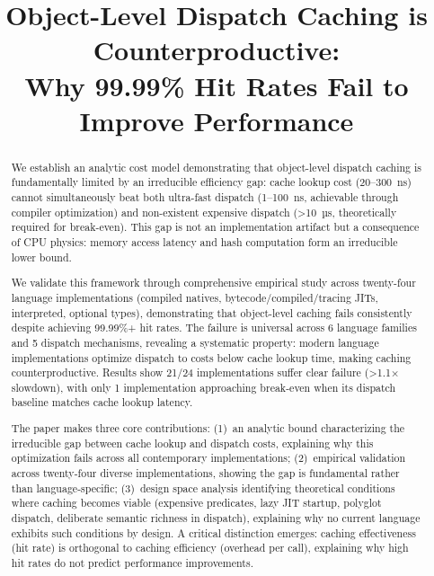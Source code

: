 \documentclass[sigplan,final,acmsmall,review,screen]{acmart}
\begin{document}
\title{Object-Level Dispatch Caching is Counterproductive: \\Why 99.99\% Hit Rates Fail to Improve Performance}


\begin{abstract}
  We establish an analytic cost model demonstrating that object-level dispatch caching is fundamentally limited by an irreducible efficiency gap:
  cache lookup cost (20--300~ns) cannot simultaneously beat both ultra-fast dispatch (1--100~ns, achievable through compiler optimization) and
  non-existent expensive dispatch (>10~µs, theoretically required for break-even). This gap is not an implementation artifact but a consequence
  of CPU physics: memory access latency and hash computation form an irreducible lower bound.

  We validate this framework through comprehensive empirical study across twenty-four language implementations (compiled natives, bytecode/compiled/tracing JITs,
  interpreted, optional types), demonstrating that object-level caching fails consistently despite achieving 99.99\%+ hit rates. The failure is universal
  across 6 language families and 5 dispatch mechanisms, revealing a systematic property: modern language implementations optimize dispatch to costs below
  cache lookup time, making caching counterproductive. Results show 21/24 implementations suffer clear failure (>1.1× slowdown), with only 1 implementation
  approaching break-even when its dispatch baseline matches cache lookup latency.

  The paper makes three core contributions: (1)~an analytic bound characterizing the irreducible gap between cache lookup and dispatch costs, explaining why
  this optimization fails across all contemporary implementations; (2)~empirical validation across twenty-four diverse implementations, showing the gap is
  fundamental rather than language-specific; (3)~design space analysis identifying theoretical conditions where caching becomes viable (expensive predicates,
  lazy JIT startup, polyglot dispatch, deliberate semantic richness in dispatch), explaining why no current language exhibits such conditions by design.
  A critical distinction emerges: caching effectiveness (hit rate) is orthogonal to caching efficiency (overhead per call), explaining why high hit rates
  do not predict performance improvements.
\end{abstract}
\end{document}
